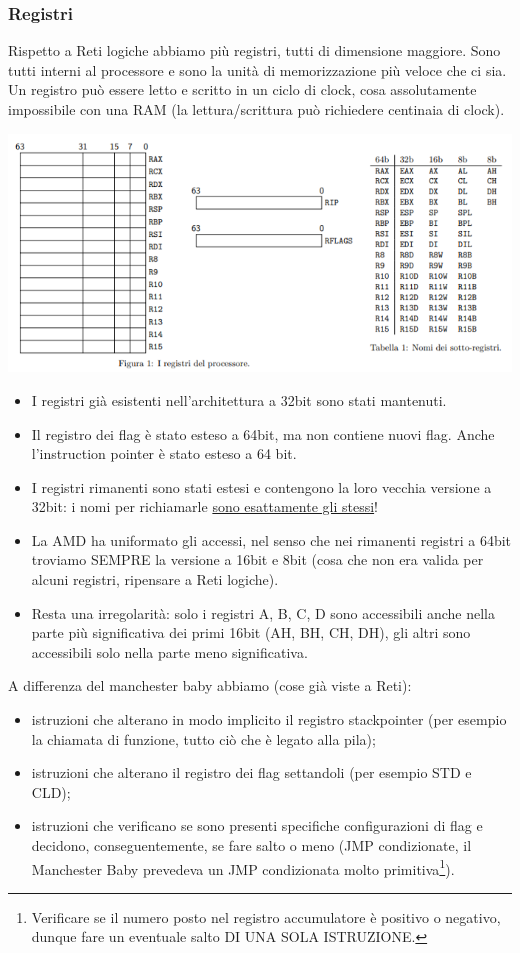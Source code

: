 \documentclass[11pt]{report}
\theoremstyle{definition}
\begin{document}
\subsubsection{Registri} Rispetto a Reti logiche abbiamo più registri, tutti di dimensione maggiore. Sono tutti interni al processore e sono la unità di memorizzazione più veloce che ci sia. Un registro può essere letto e scritto in un ciclo di clock, cosa assolutamente impossibile con una RAM (la lettura/scrittura può richiedere centinaia di clock). 
\begin{center}
\includegraphics{img/5.PNG}
\end{center}
\begin{itemize}
\item I registri già esistenti nell'architettura a 32bit sono stati mantenuti.
\item Il registro dei flag è stato esteso a 64bit, ma non contiene nuovi flag. Anche l'instruction pointer è stato esteso a 64 bit.
\item I registri rimanenti sono stati estesi e contengono la loro vecchia versione a 32bit: i nomi per richiamarle \underline{sono esattamente gli stessi}!
\item La AMD ha uniformato gli accessi, nel senso che nei rimanenti registri a 64bit troviamo SEMPRE la versione a 16bit e 8bit (cosa che non era valida per alcuni registri, ripensare a Reti logiche). 
\item Resta una irregolarità: solo i registri A, B, C, D sono accessibili anche nella parte più significativa dei primi 16bit (AH, BH, CH, DH), gli altri sono accessibili solo nella parte meno significativa.
\end{itemize}
A differenza del manchester baby abbiamo (cose già viste a Reti):
\begin{itemize}
\item istruzioni che alterano in modo implicito il registro stackpointer (per esempio la chiamata di funzione, tutto ciò che è legato alla pila);
\item istruzioni che alterano il registro dei flag settandoli (per esempio STD e CLD);
\item istruzioni che verificano se sono presenti specifiche configurazioni di flag e decidono, conseguentemente, se fare salto o meno (JMP condizionate, il Manchester Baby prevedeva un JMP condizionata molto primitiva\footnote{Verificare se il numero posto nel registro accumulatore è positivo o negativo, dunque fare un eventuale salto DI UNA SOLA ISTRUZIONE.}).
\end{itemize}
\end{document}
